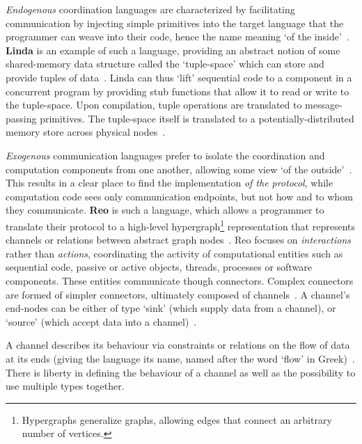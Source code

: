 \textit{Endogenous} coordination languages are characterized by facilitating communication by injecting simple primitives into the target language that the programmer can weave into their code, hence the name meaning `of the inside'~\cite{coordination}. \textbf{Linda} is an example of such a language, providing an abstract notion of some shared-memory data structure called the `tuple-space' which can store and provide tuples of data~\cite{reoLinda, linda}. Linda can thus `lift' sequential code to a component in a concurrent program by providing stub functions that allow it to read or write to the tuple-space. Upon compilation, tuple operations are translated to message-passing primitives. The tuple-space itself is translated to a potentially-distributed memory store across physical nodes~\cite{linda}.

\textit{Exogenous} communication languages prefer to isolate the coordination and computation components from one another, allowing some view `of the outside'~\cite{reoLinda}. This results in a clear place to find the implementation \textit{of the protocol}, while computation code sees only communication endpoints, but not how and to whom they communicate. \textbf{Reo} is such a language, which allows a programmer to translate their protocol to a high-level hypergraph\footnote{Hypergraphs generalize graphs, allowing edges that connect an arbitrary number of vertices.} representation that represents channels or relations between abstract graph nodes~\cite{criticalPathReo}. 
Reo focuses on \textit{interactions} rather than \textit{actions}, coordinating the activity of computational entities such as sequential code, passive or active objects, threads, processes or software components. These entities communicate though connectors. Complex connectors are formed of simpler connectors, ultimately composed of channels~\cite{introReo}. A channel's end-nodes can be either of type `sink' (which supply data from a channel), or `source' (which accept data into a channel)~\cite{proper}. 

A channel describes its behaviour via constraints or relations on the flow of data at its ends (giving the language its name, named after the word `flow' in Greek)~\cite{introReo, criticalPathReo}. There is liberty in defining the behaviour of a channel as well as the possibility to use multiple types together.

